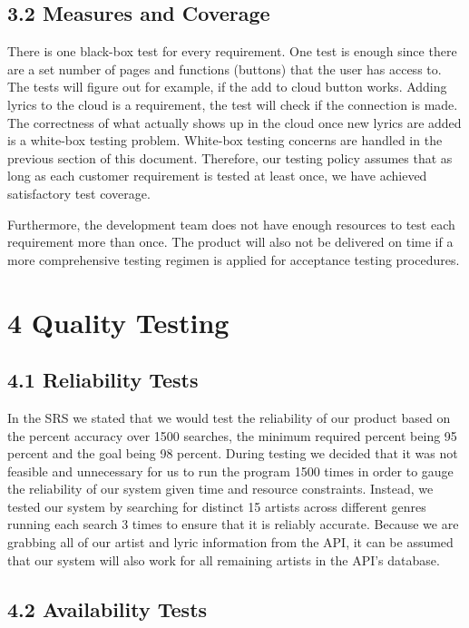 \documentclass[]{article}
\begin{document}
\subsection{3.2 Measures and
Coverage}\label{measures-and-coverage-1}

There is one black-box test for every requirement. One test is enough
since there are a set number of pages and functions (buttons) that the
user has access to. The tests will figure out for example, if the add to
cloud button works. Adding lyrics to the cloud is a requirement, the
test will check if the connection is made. The correctness of what
actually shows up in the cloud once new lyrics are added is a white-box
testing problem. White-box testing concerns are handled in the previous
section of this document. Therefore, our testing policy assumes that as
long as each customer requirement is tested at least once, we have
achieved satisfactory test coverage.

Furthermore, the development team does not have enough resources to test
each requirement more than once. The product will also not be delivered
on time if a more comprehensive testing regimen is applied for
acceptance testing procedures.

\section{4 Quality Testing}\label{quality-testing}

\subsection{4.1 Reliability Tests}\label{reliability-tests}

In the SRS we stated that we would test the reliability of our product
based on the percent accuracy over 1500 searches, the minimum required
percent being 95 percent and the goal being 98 percent. During testing
we decided that it was not feasible and unnecessary for us to run the
program 1500 times in order to gauge the reliability of our system given
time and resource constraints. Instead, we tested our system by
searching for distinct 15 artists across different genres running each
search 3 times to ensure that it is reliably accurate. Because we are
grabbing all of our artist and lyric information from the API, it can be
assumed that our system will also work for all remaining artists in the
API's database.

\subsection{4.2 Availability Tests}\label{availability-tests}
\end{document}
